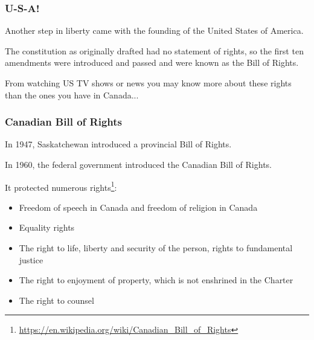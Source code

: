 \begin{frame}
\frametitle{U-S-A!}

Another step in liberty came with the founding of the United States of America.

The constitution as originally drafted had no statement of rights, so the first ten amendments were introduced and passed and were known as the Bill of Rights.

From watching US TV shows or news you may know more about these rights than the ones you have in Canada...

\end{frame}



\begin{frame}
\frametitle{Canadian Bill of Rights}

In 1947, Saskatchewan introduced a provincial Bill of Rights.

In 1960, the federal government introduced the Canadian Bill of Rights.

It protected numerous rights\footnote{\url{https://en.wikipedia.org/wiki/Canadian\_Bill\_of\_Rights}}:

\begin{itemize}
\item Freedom of speech in Canada and freedom of religion in Canada
\item Equality rights
\item The right to life, liberty and security of the person, rights to fundamental justice
\item The right to enjoyment of property, which is not enshrined in the Charter
\item The right to counsel
\end{itemize}

\end{frame}



